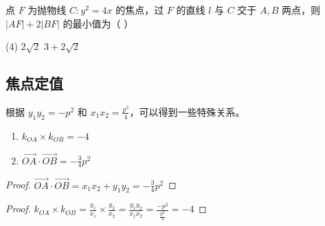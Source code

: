 \begin{example}
    点 $F$ 为抛物线 $C: y^2=4 x$ 的焦点，过 $F$ 的直线 $l$ 与 $C$ 交于 $A, B$ 两点，则 $|A F|+2|B F|$ 的最小值为（ \hspace{2em}）
    \begin{tasks}(4)
        \task $2 \sqrt{2}$
        \task $3+2 \sqrt{2}$
    \end{tasks}
\end{example}

\subsection{焦点定值}

根据 $y_1 y_2 = - p^2$ 和 $x_1 x_2 = \frac{p^2}{4}$，可以得到一些特殊关系。

\begin{theorem}[斜率和点乘定值]
    \begin{enumerate}
        \item $k_{OA} \times k_{OB} = -4$
        \item $\overrightarrow{OA} \cdot \overrightarrow{OB} = -\frac34p^2$
    \end{enumerate}
\end{theorem}

\begin{proof}
    $\overrightarrow{OA} \cdot \overrightarrow{OB} = x_1 x_2 + y_1 y_2 = -\frac34p^2$
\end{proof}

\begin{proof}
    $k_{OA} \times k_{OB} = \frac{y_1}{x_1} \times \frac{y_2}{x_2} = \frac{y_1 y_2}{x_1 x_2} = \frac{-p^2}{\frac{p^2}{4}} = -4$
\end{proof}